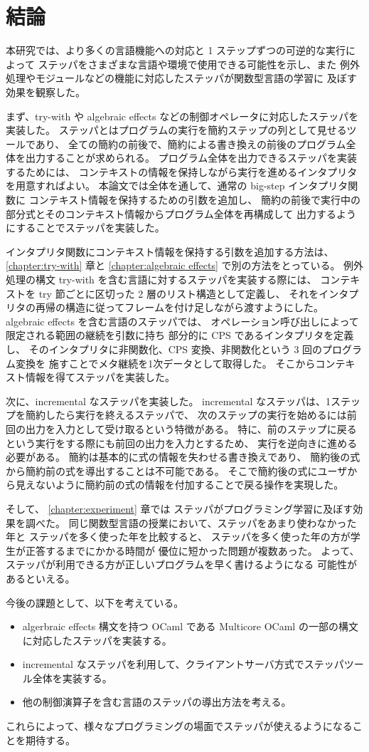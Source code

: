 \chapter{結論}
\label{chapter:conclusion}

本研究では、より多くの言語機能への対応と 1 ステップずつの可逆的な実行によって
ステッパをさまざまな言語や環境で使用できる可能性を示し、また
例外処理やモジュールなどの機能に対応したステッパが関数型言語の学習に
及ぼす効果を観察した。

まず、try-with や algebraic effects などの制御オペレータに対応したステッパを実装した。
ステッパとはプログラムの実行を簡約ステップの列として見せるツールであり、
全ての簡約の前後で、簡約による書き換えの前後のプログラム全体を出力することが求められる。
プログラム全体を出力できるステッパを実装するためには、
コンテキストの情報を保持しながら実行を進めるインタプリタを用意すればよい。
本論文では全体を通して、通常の big-step インタプリタ関数に
コンテキスト情報を保持するための引数を追加し、
簡約の前後で実行中の部分式とそのコンテキスト情報からプログラム全体を再構成して
出力するようにすることでステッパを実装した。

インタプリタ関数にコンテキスト情報を保持する引数を追加する方法は、
\ref{chapter:try-with} 章と \ref{chapter:algebraic effects}
で別の方法をとっている。
例外処理の構文 try-with を含む言語に対するステッパを実装する際には、
コンテキストを try 節ごとに区切った 2 層のリスト構造として定義し、
それをインタプリタの再帰の構造に従ってフレームを付け足しながら渡すようにした。
algebraic effects を含む言語のステッパでは、
オペレーション呼び出しによって限定される範囲の継続を引数に持ち
部分的に CPS であるインタプリタを定義し、
そのインタプリタに非関数化、CPS 変換、非関数化という 3 回のプログラム変換を
施すことでメタ継続を1次データとして取得した。
そこからコンテキスト情報を得てステッパを実装した。

次に、incremental なステッパを実装した。
incremental なステッパは、1ステップを簡約したら実行を終えるステッパで、
次のステップの実行を始めるには前回の出力を入力として受け取るという特徴がある。
特に、前のステップに戻るという実行をする際にも前回の出力を入力とするため、
実行を逆向きに進める必要がある。
簡約は基本的に式の情報を失わせる書き換えであり、
簡約後の式から簡約前の式を導出することは不可能である。
そこで簡約後の式にユーザから見えないように簡約前の式の情報を付加することで戻る操作を実現した。

そして、 \ref{chapter:experiment} 章では
ステッパがプログラミング学習に及ぼす効果を調べた。
同じ関数型言語の授業において、ステッパをあまり使わなかった年と
ステッパを多く使った年を比較すると、
ステッパを多く使った年の方が学生が正答するまでにかかる時間が
優位に短かった問題が複数あった。
よって、ステッパが利用できる方が正しいプログラムを早く書けるようになる
可能性があるといえる。

今後の課題として、以下を考えている。

\begin{itemize}
\item algerbraic effects 構文を持つ OCaml である Multicore OCaml の一部の構文に対応したステッパを実装する。
\item incremental なステッパを利用して、クライアントサーバ方式でステッパツール全体を実装する。
\item 他の制御演算子を含む言語のステッパの導出方法を考える。
\end{itemize}

\noindent これらによって、様々なプログラミングの場面でステッパが使えるようになることを期待する。
